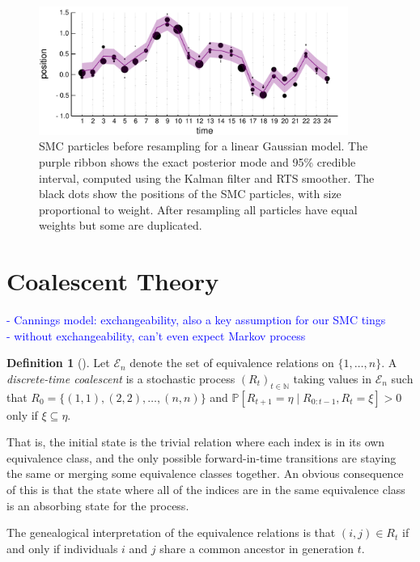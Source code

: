 \documentclass[fleqn]{article}
\theoremstyle{definition}
\newtheorem{defn}{Definition}
\newcommand{\PR}{\mathbb{P}}
\begin{document}
\begin{figure}
\centering
\includegraphics[width=0.9\textwidth]{smc_kalman.pdf}
\caption{SMC particles before resampling for a linear Gaussian model. The purple ribbon shows the exact posterior mode and 95\% credible interval, computed using the Kalman filter and RTS smoother. The black dots show the positions of the SMC particles, with size proportional to weight. After resampling all particles have equal weights but some are duplicated.}
\label{fig:SMC_vs_kalman}
\end{figure}


\section{Coalescent Theory}\label{sec:coalescent_theory}
\textcolor{blue}{
- Cannings model: exchangeability, also a key assumption for our SMC tings\\
- without exchangeability, can't even expect Markov process
}

\begin{defn}[\citet{mohle1998}]
Let $\mathcal{E}_n$ denote the set of equivalence relations on $\{1,\dots,n\}$.
A \emph{discrete-time coalescent} is a stochastic process $(R_t)_{t\in\mathbb{N}}$ taking values in $\mathcal{E}_n$ such that 
$R_0 = \{(1,1),(2,2),\dots,(n,n)\}$ and $\PR[R_{t+1} = \eta \mid R_{0:t-1}, R_{t} = \xi] > 0$ only if $\xi \subseteq \eta$.
\end{defn}
That is, the initial state is the trivial relation where each index is in its own equivalence class, and the only possible forward-in-time transitions are staying the same or merging some equivalence classes together.
An obvious consequence of this is that the state where all of the indices are in the same equivalence class is an absorbing state for the process.

The genealogical interpretation of the equivalence relations is that $(i,j) \in R_t$ if and only if individuals $i$ and $j$ share a common ancestor in generation $t$.
\end{document}
